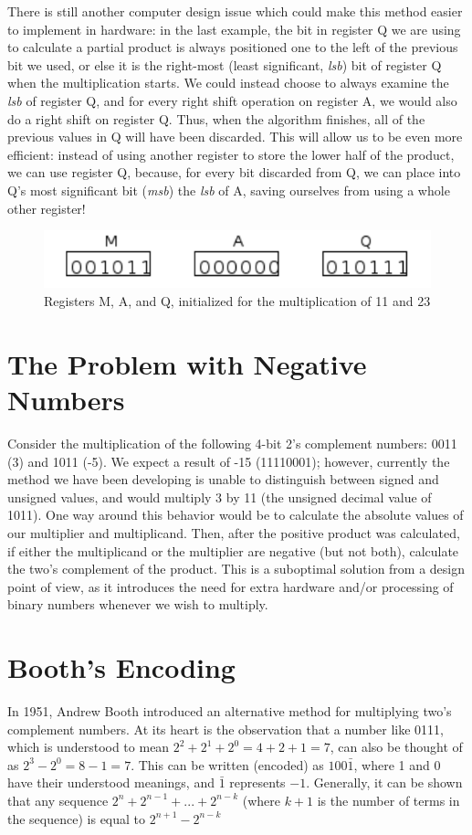\documentclass{article}
\begin{document}
There is still another computer design issue which could make this method easier to implement in hardware: in the last example, the bit in register Q we are using to calculate a partial product is always positioned one to the left of the previous bit we used, or else it is the right-most (least significant, \emph{lsb}) bit of register Q when the multiplication starts.
We could instead choose to always examine the \emph{lsb} of register Q, and for every right shift operation on register A, we would also do a right shift on register Q.
Thus, when the algorithm finishes, all of the previous values in Q will have been discarded.
This will allow us to be even more efficient: instead of using another register to store the lower half of the product, we can use register Q, because, for every bit discarded from Q, we can place into Q's most significant bit (\emph{msb}) the \emph{lsb} of A, saving ourselves from using a whole other register!

\pagebreak
\begin{figure}
\centering
\includegraphics{init.pdf}
\caption{Registers M, A, and Q, initialized for the multiplication of 11 and 23}
\end{figure}

\section{The Problem with Negative Numbers}
Consider the multiplication of the following 4-bit 2's complement numbers: 0011 (3) and 1011 (-5).
We expect a result of -15 (11110001); however, currently the method we have been developing is unable to distinguish between signed and unsigned values, and would multiply 3 by 11 (the unsigned decimal value of 1011).
One way around this behavior would be to calculate the absolute values of our multiplier and multiplicand.
Then, after the positive product was calculated, if either the multiplicand or the multiplier are negative (but not both), calculate the two's complement of the product.
This is a suboptimal solution from a design point of view, as it introduces the need for extra hardware and/or processing of binary numbers whenever we wish to multiply.

\section{Booth's Encoding}
In 1951, Andrew Booth introduced an alternative method for multiplying two's complement numbers.
At its heart is the observation that a number like 0111, which is understood to mean $2^2 + 2^1 + 2^0 = 4 + 2 + 1 = 7$, can also be thought of as $2^3 - 2^0 = 8 - 1 = 7$.
This can be written (encoded) as $100\bar{1}$, where 1 and 0 have their understood meanings, and $\bar{1}$ represents $-1$.
Generally, it can be shown that any sequence $2^n + 2^{n-1} + ...
+ 2^{n-k}$ (where $k+1$ is the number of terms in the sequence) is equal to $2^{n+1} - 2^{n-k}$
\end{document}
